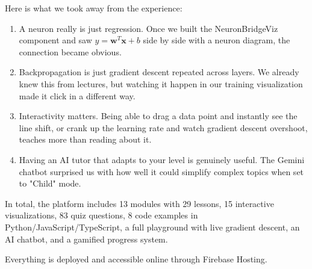 \documentclass[12pt, a4paper]{article}
\begin{document}
Here is what we took away from the experience:
\begin{enumerate}
    \item A neuron really is just regression. Once we built the NeuronBridgeViz component and saw $y = \mathbf{w}^T\mathbf{x} + b$ side by side with a neuron diagram, the connection became obvious.
    
    \item Backpropagation is just gradient descent repeated across layers. We already knew this from lectures, but watching it happen in our training visualization made it click in a different way.
    
    \item Interactivity matters. Being able to drag a data point and instantly see the line shift, or crank up the learning rate and watch gradient descent overshoot, teaches more than reading about it.
    
    \item Having an AI tutor that adapts to your level is genuinely useful. The Gemini chatbot surprised us with how well it could simplify complex topics when set to "Child" mode.
\end{enumerate}

In total, the platform includes 13 modules with 29 lessons, 15 interactive visualizations, 83 quiz questions, 8 code examples in Python/JavaScript/TypeScript, a full playground with live gradient descent, an AI chatbot, and a gamified progress system.

Everything is deployed and accessible online through Firebase Hosting.
\end{document}
